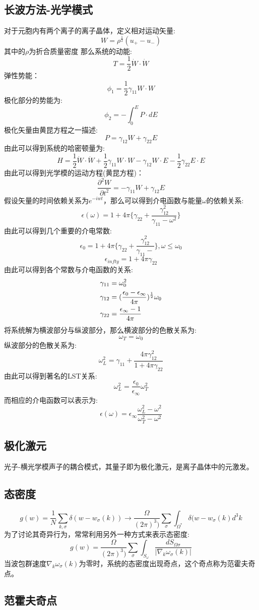 \subsection{长波方法-光学模式}
对于元胞内有两个离子的离子晶体，定义相对运动矢量:
\[W=\rho^{\frac{1}{2}}(u_+-u_-)\]
其中的$\rho$为折合质量密度
那么系统的动能:
\[T=\frac{1}{2}\dot{W}\cdot\dot{W}\]
弹性势能：
\[\phi_1=\frac{1}{2}\gamma_{11}W\cdot W\]
极化部分的势能为:
\[\phi_2=-\int_0^EP\cdot dE\]
极化矢量由黄昆方程之一描述:
\[P=\gamma_{12}W+\gamma_{22}E\]
由此可以得到系统的哈密顿量为:
\[H=\frac{1}{2}\dot{W}\cdot\dot{W}+\frac{1}{2}\gamma_{11}W\cdot W-\gamma_{12}W\cdot E-\frac{1}{2}\gamma_{22}E\cdot E\]
由此可以得到光学模的运动方程(黄昆方程)：
\[\frac{\partial^2 W}{\partial t^2}=-\gamma_{11}W+\gamma_{12}E\]
假设矢量的时间依赖关系为$e^{-iwt}$，那么可以得到介电函数与能量$\omega$的依赖关系:
\[\epsilon(\omega)=1+4\pi\{\gamma_{22}+\frac{\gamma_{12}^2}{\gamma_{11}-\omega^2}\}\]
由此可以得到几个重要的介电常数:
\[\epsilon_0=1+4\pi\{\gamma_{22}+\frac{\gamma_{12}^2}{\gamma_{11}-}\},\omega\le\omega_0\]
\[\epsilon_{infty}=1+4\pi\gamma_{22}\]
由此可以得到各个常数与介电函数的关系:
\begin{align}
\notag \gamma_{11}&=\omega_0^2\\
\notag \gamma_{12}&=(\frac{\epsilon_0-\epsilon_\infty}{4\pi})^{\frac{1}{2}}\omega_0\\
\gamma_{22}&=\frac{\epsilon_\infty-1}{4\pi}
\end{align}
将系统解为横波部分与纵波部分，那么横波部分的色散关系为:
\[\omega_T=\omega_0\]
纵波部分的色散关系为:
\[\omega_L^2=\gamma_{11}+\frac{4\pi\gamma_{12}^2}{1+4\pi\gamma_{22}}\]
由此可以得到著名的LST关系:
\[\omega_L^2=\frac{\epsilon_0}{\epsilon_\infty}\omega_T^2\]
而相应的介电函数可以表示为:
\[\epsilon(\omega)=\epsilon_\infty\frac{\omega_L^2-\omega^2}{\omega_T^2-\omega^2}\]
\subsection{极化激元}
光子-横光学模声子的耦合模式，其量子即为极化激元，是离子晶体中的元激发。\par
\subsection{态密度}
\[g(w)=\frac{1}{N}\sum_{k,\sigma}\delta(w-w_\sigma(k))\rightarrow \frac{\Omega}{(2\pi)^3)}\sum_\sigma\int_{\Omega^*}\delta(w-w_\sigma(k)d^3k\]
为了讨论其奇异行为，常常利用另外一种方式来表示态密度:
\[g(w)=\frac{\Omega}{(2\pi)^3)}\sum_\sigma\int_{S_\omega}\frac{dS_{\Omega\sigma}}{|\nabla_k\omega_\sigma(k)|}\]
当波包群速度$\nabla_k\omega_\sigma(k)$为零时，系统的态密度出现奇点，这个奇点称为范霍夫奇点。\par
\subsection{范霍夫奇点}

